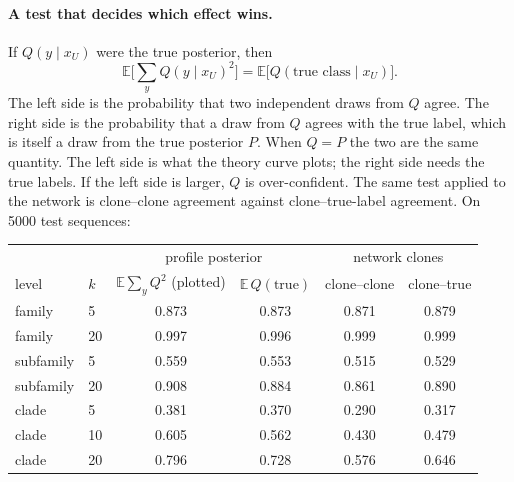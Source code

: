 \documentclass[11pt,a4paper]{article}
\newcommand{\E}{\mathbb{E}}
\begin{document}
\paragraph{A test that decides which effect wins.} If $Q(y\mid x_U)$ were the true posterior, then
\[
\E\Big[\sum_yQ(y\mid x_U)^2\Big]=\E\big[Q(\text{true class}\mid x_U)\big].
\]
The left side is the probability that two independent draws from $Q$ agree. The right side is the probability that a
draw from $Q$ agrees with the true label, which is itself a draw from the true posterior $P$. When $Q=P$ the two are the
same quantity. The left side is what the theory curve plots; the right side needs the true labels.
If the left side is larger, $Q$ is over-confident. The same test applied to the network is
clone--clone agreement against clone--true-label agreement. On 5000 test sequences:
\begin{center}\small
\begin{tabular}{llcccc}
\toprule
 & & \multicolumn{2}{c}{profile posterior} & \multicolumn{2}{c}{network clones}\\
level & $k$ & $\E\sum_yQ^2$ (plotted) & $\E\,Q(\text{true})$ & clone--clone & clone--true\\
\midrule
family & 5 & 0.873 & 0.873 & 0.871 & 0.879\\
family & 20 & 0.997 & 0.996 & 0.999 & 0.999\\
\midrule
subfamily & 5 & 0.559 & 0.553 & 0.515 & 0.529\\
subfamily & 20 & 0.908 & 0.884 & 0.861 & 0.890\\
\midrule
clade & 5 & 0.381 & 0.370 & 0.290 & 0.317\\
clade & 10 & 0.605 & 0.562 & 0.430 & 0.479\\
clade & 20 & 0.796 & 0.728 & 0.576 & 0.646\\
\bottomrule
\end{tabular}
\end{center}
\end{document}
